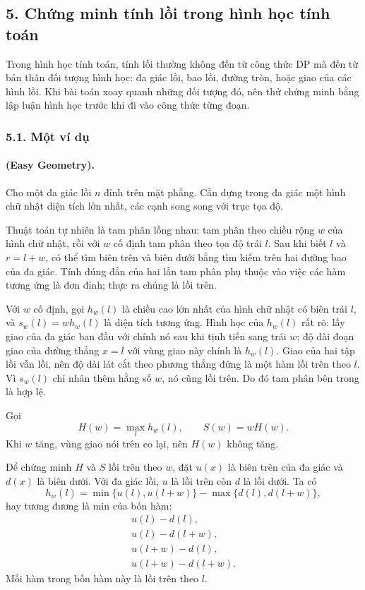 \documentclass[11pt]{article}
\begin{document}
\subsection*{5. Chứng minh tính lồi trong hình học tính toán}

Trong hình học tính toán, tính lồi thường không đến từ công thức DP mà đến
từ bản thân đối tượng hình học: đa giác lồi, bao lồi, đường tròn, hoặc giao
của các hình lồi. Khi bài toán xoay quanh những đối tượng đó, nên thử chứng
minh bằng lập luận hình học trước khi đi vào công thức từng đoạn.

\subsubsection*{5.1. Một ví dụ}

\paragraph{ (Easy Geometry).}
Cho một đa giác lồi $n$ đỉnh trên mặt phẳng. Cần dựng trong đa giác một hình
chữ nhật diện tích lớn nhất, các cạnh song song với trục tọa độ.

Thuật toán tự nhiên là tam phân lồng nhau: tam phân theo chiều rộng $w$ của
hình chữ nhật, rồi với $w$ cố định tam phân theo tọa độ trái $l$. Sau khi biết
$l$ và $r=l+w$, có thể tìm biên trên và biên dưới bằng tìm kiếm trên hai đường
bao của đa giác. Tính đúng đắn của hai lần tam phân phụ thuộc vào việc các
hàm tương ứng là đơn đỉnh; thực ra chúng là lồi trên.

Với $w$ cố định, gọi $h_w(l)$ là chiều cao lớn nhất của hình chữ nhật có biên
trái $l$, và $s_w(l)=w h_w(l)$ là diện tích tương ứng. Hình học của $h_w(l)$
rất rõ: lấy giao của đa giác ban đầu với chính nó sau khi tịnh tiến sang trái
$w$; độ dài đoạn giao của đường thẳng $x=l$ với vùng giao này chính là
$h_w(l)$. Giao của hai tập lồi vẫn lồi, nên độ dài lát cắt theo phương thẳng
đứng là một hàm lồi trên theo $l$. Vì $s_w(l)$ chỉ nhân thêm hằng số $w$, nó
cũng lồi trên. Do đó tam phân bên trong là hợp lệ.

Gọi
\[
  H(w)=\max_l h_w(l),\qquad S(w)=wH(w).
\]
Khi $w$ tăng, vùng giao nói trên co lại, nên $H(w)$ không tăng.

Để chứng minh $H$ và $S$ lồi trên theo $w$, đặt $u(x)$ là biên trên của đa
giác và $d(x)$ là biên dưới. Với đa giác lồi, $u$ là lồi trên còn $d$ là lồi
dưới. Ta có
\[
  h_w(l)=\min\{u(l),u(l+w)\}-\max\{d(l),d(l+w)\},
\]
hay tương đương là min của bốn hàm:
\[
\begin{array}{l}
u(l)-d(l),\\
u(l)-d(l+w),\\
u(l+w)-d(l),\\
u(l+w)-d(l+w).
\end{array}
\]
Mỗi hàm trong bốn hàm này là lồi trên theo $l$.
\end{document}
